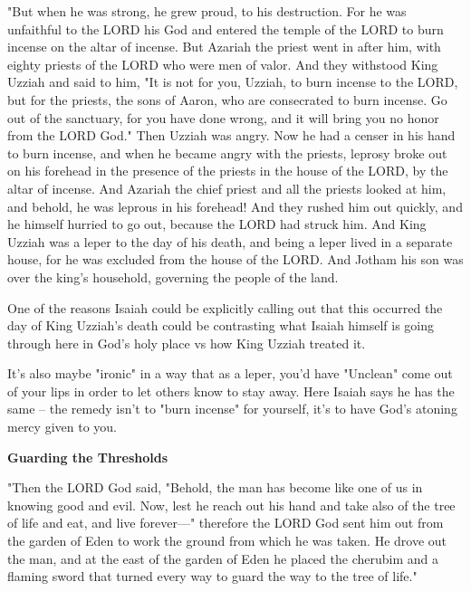 \documentclass[11pt]{article}
\begin{document}
\begin{versesection}{2em}

 "But when he was strong, he grew proud, to his destruction. For he was unfaithful to the LORD his God and entered the temple of the LORD to burn incense on the altar of incense.  But Azariah the priest went in after him, with eighty priests of the LORD who were men of valor.  And they withstood King Uzziah and said to him, "It is not for you, Uzziah, to burn incense to the LORD, but for the priests, the sons of Aaron, who are consecrated to burn incense. Go out of the sanctuary, for you have done wrong, and it will bring you no honor from the LORD God."  Then Uzziah was angry. Now he had a censer in his hand to burn incense, and when he became angry with the priests, leprosy broke out on his forehead in the presence of the priests in the house of the LORD, by the altar of incense.  And Azariah the chief priest and all the priests looked at him, and behold, he was leprous in his forehead! And they rushed him out quickly, and he himself hurried to go out, because the LORD had struck him.  And King Uzziah was a leper to the day of his death, and being a leper lived in a separate house, for he was excluded from the house of the LORD. And Jotham his son was over the king's household, governing the people of the land.

\end{versesection}

{\vspace{1em}}

One of the reasons Isaiah could be explicitly calling out that this occurred the day of King Uzziah's death could be contrasting what Isaiah himself is going through here in God's holy place vs how King Uzziah treated it.

{\vspace{1em}}
It's also maybe "ironic" in a way that as a leper, you'd have "Unclean" come out of your lips in order to let others know to stay away. Here Isaiah says he has the same – the remedy isn't to "burn incense" for yourself, it's to have God's atoning mercy given to you.

{\vspace{2em}}
{\large\bfseries Guarding the Thresholds}


{\vspace{1em}}


\begin{versesection}{2em}

 "Then the LORD God said, "Behold, the man has become like one of us in knowing good and evil. Now, lest he reach out his hand and take also of the tree of life and eat, and live forever—"  therefore the LORD God sent him out from the garden of Eden to work the ground from which he was taken.  He drove out the man, and at the east of the garden of Eden he placed the cherubim and a flaming sword that turned every way to guard the way to the tree of life."

\end{versesection}
\end{document}
